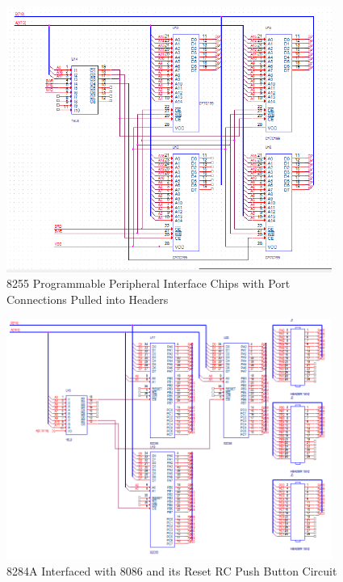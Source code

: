         \begin{figure}[ht]
            \begin{center}
                \includegraphics[width=0.95\textwidth]{figures/schematics/page4.png}
                \caption{8255 Programmable Peripheral Interface Chips with Port Connections Pulled into Headers} \label{fig:page4}
            \end{center}
        \end{figure}

        \begin{figure}[ht]
            \begin{center}
                \includegraphics[width=0.95\textwidth]{figures/schematics/page5.png}
                \caption{8284A Interfaced with 8086 and its Reset RC Push Button Circuit} \label{fig:page5}
            \end{center}
        \end{figure}

